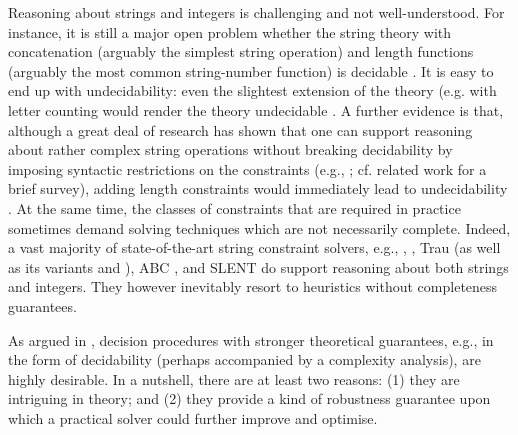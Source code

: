 Reasoning about strings and integers is challenging and not well-understood. For instance, it is still a major open problem whether the string theory with concatenation (arguably the simplest string operation) and length functions (arguably the most common string-number function) is decidable \cite{Vijay-length}. It is easy to end up with undecidability: even the slightest extension of the theory (e.g. with letter counting %
would render the theory undecidable \cite{buchi,GB16}. A further evidence is that, although a great deal of research has shown that one can support reasoning about rather complex string operations without breaking decidability by imposing syntactic restrictions on the constraints (e.g., \cite{CCH+18,CHL+19}; cf. related work for a brief survey), adding length constraints would immediately lead to undecidability \cite{CCH+18}. At the same time, the classes of constraints that are required in practice sometimes demand solving techniques which are not necessarily complete. %
%
Indeed, a vast majority of  state-of-the-art string constraint solvers, e.g., {\cvc} \cite{cvc4}, {\zthree} \cite{Z3-str3}, Trau \cite{Abdulla17} (as well as its variants {\trauplus} \cite{AbdullaA+19} and {\zthreetrau} \cite{Z3-trau}),  ABC \cite{ABC}, and SLENT \cite{WC+18} do support  reasoning about both strings and integers.
They however inevitably  resort to heuristics without completeness guarantees. 


As argued in \cite{CHL+19}, decision procedures with stronger theoretical guarantees, e.g., in the form of decidability (perhaps accompanied by a complexity analysis), are highly desirable. In a nutshell, there are at least two reasons: (1) they are intriguing in theory; and  %
(2) they provide a kind of robustness guarantee upon which a practical solver could further improve and optimise.


